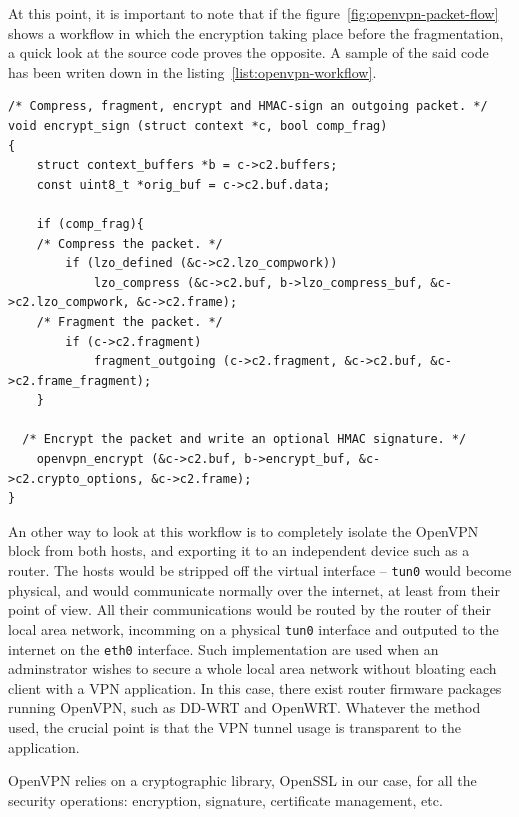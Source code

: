 \noindent At this point, it is important to note that if the figure~\ref{fig:openvpn-packet-flow} shows a workflow in which the encryption taking place before the fragmentation, a quick look at the source code proves the opposite.
A sample of the said code has been writen down in the listing~\ref{list:openvpn-workflow}.


\lstset{language=c}
\begin{lstlisting}[caption={openvpn compress then encrypt -- sample from \texttt{forward.c}. It clearly shows that the order of operations in the packet workflow is compression, then fragmentation and finally encryption.}, label=list:openvpn-workflow, float]% The 'float' option makes the listing unbreakable.
/* Compress, fragment, encrypt and HMAC-sign an outgoing packet. */
void encrypt_sign (struct context *c, bool comp_frag)
{
	struct context_buffers *b = c->c2.buffers;
	const uint8_t *orig_buf = c->c2.buf.data;

	if (comp_frag){
	/* Compress the packet. */
		if (lzo_defined (&c->c2.lzo_compwork))
			lzo_compress (&c->c2.buf, b->lzo_compress_buf, &c->c2.lzo_compwork, &c->c2.frame);
	/* Fragment the packet. */
		if (c->c2.fragment)
			fragment_outgoing (c->c2.fragment, &c->c2.buf, &c->c2.frame_fragment);
	}

  /* Encrypt the packet and write an optional HMAC signature. */
	openvpn_encrypt (&c->c2.buf, b->encrypt_buf, &c->c2.crypto_options, &c->c2.frame);
}
\end{lstlisting}

An other way to look at this workflow is to completely isolate the OpenVPN block from both hosts, and exporting it to an independent device such as a router.
The hosts would be stripped off the virtual interface -- \texttt{tun0} would become physical, and would communicate normally over the internet, at least from their point of view.
All their communications would be routed by the router of their local area network, incomming on a physical \texttt{tun0} interface and outputed to the internet on the \texttt{eth0} interface.
Such implementation are used when an adminstrator wishes to secure a whole local area network without bloating each client with a VPN application.
In this case, there exist router firmware packages running OpenVPN, such as DD-WRT and OpenWRT.
Whatever the method used, the crucial point is that the VPN tunnel usage is transparent to the application.\newline{}

OpenVPN relies on a cryptographic library, OpenSSL in our case, for all the security operations: encryption, signature, certificate management, etc.

